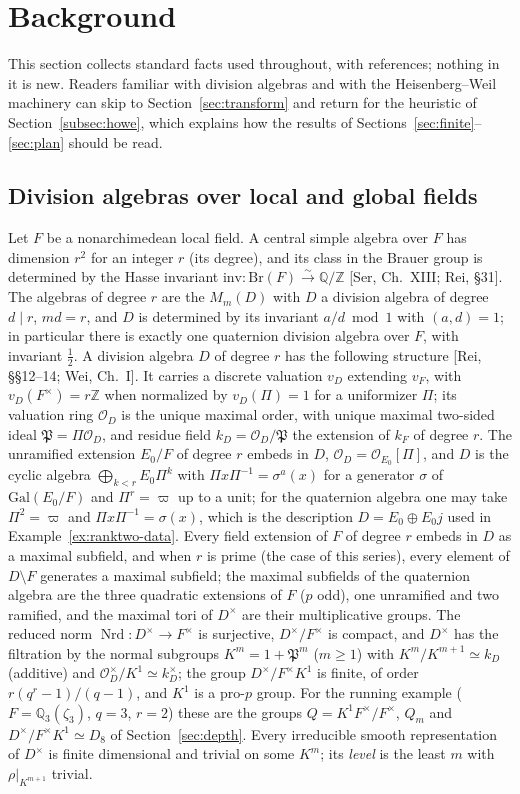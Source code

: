 \documentclass[11pt]{article}
\newcommand{\Z}{\mathbb Z}
\newcommand{\Q}{\mathbb Q}
\newcommand{\Nrd}{\operatorname{Nrd}}
\newcommand{\Ocal}{\mathcal O}
\newcommand{\Pfr}{\mathfrak P}
\theoremstyle{plain}
\theoremstyle{definition}
\begin{document}
\section{Background}\label{sec:background}
This section collects standard facts used throughout, with references;
nothing in it is new.  Readers familiar with division algebras and with
the Heisenberg--Weil machinery can skip to Section~\ref{sec:transform}
and return for the heuristic of Section~\ref{subsec:howe}, which explains
how the results of Sections~\ref{sec:finite}--\ref{sec:plan} should be
read.

\subsection{Division algebras over local and global fields}\label{subsec:divalg}
Let $F$ be a nonarchimedean local field.  A central simple algebra over
$F$ has dimension $r^2$ for an integer $r$ (its degree), and its class in
the Brauer group is determined by the Hasse invariant
$\mathrm{inv}:\mathrm{Br}(F)\xrightarrow{\sim}\Q/\Z$ [Ser, Ch.~XIII; Rei,
\S31].  The algebras of degree $r$ are the $M_m(D)$ with $D$ a division
algebra of degree $d\mid r$, $md=r$, and $D$ is determined by its
invariant $a/d\bmod1$ with $(a,d)=1$; in particular there is exactly one
quaternion division algebra over $F$, with invariant $\tfrac12$.  A
division algebra $D$ of degree $r$ has the following structure
[Rei, \S\S12--14; Wei, Ch.~I].  It carries a discrete valuation $v_D$
extending $v_F$, with $v_D(F^\times)=r\Z$ when normalized by
$v_D(\Pi)=1$ for a uniformizer $\Pi$; its valuation ring $\Ocal_D$ is the
unique maximal order, with unique maximal two-sided ideal
$\Pfr=\Pi\Ocal_D$, and residue field $k_D=\Ocal_D/\Pfr$ the extension of
$k_F$ of degree $r$.  The unramified extension $E_0/F$ of degree $r$
embeds in $D$, $\Ocal_D=\Ocal_{E_0}[\Pi]$, and $D$ is the cyclic algebra
$\bigoplus_{k<r}E_0\Pi^k$ with $\Pi x\Pi^{-1}=\sigma^a(x)$ for a
generator $\sigma$ of $\mathrm{Gal}(E_0/F)$ and $\Pi^r=\varpi$ up to a
unit; for the quaternion algebra one may take $\Pi^2=\varpi$ and
$\Pi x\Pi^{-1}=\sigma(x)$, which is the description
$D=E_0\oplus E_0j$ used in Example~\ref{ex:ranktwo-data}.  Every field
extension of $F$ of degree $r$ embeds in $D$ as a maximal subfield, and
when $r$ is prime (the case of this series), every element of
$D\setminus F$ generates a maximal subfield; the
maximal subfields of the quaternion algebra are the three quadratic
extensions of $F$ ($p$ odd), one unramified and two ramified, and the
maximal tori of $D^\times$ are their multiplicative groups.  The reduced
norm $\Nrd:D^\times\to F^\times$ is surjective, $D^\times/F^\times$ is
compact, and $D^\times$ has the filtration by the normal subgroups
$K^m=1+\Pfr^m$ ($m\ge1$) with $K^m/K^{m+1}\simeq k_D$ (additive) and
$\Ocal_D^\times/K^1\simeq k_D^\times$; the group $D^\times/F^\times K^1$
is finite, of order $r(q^r-1)/(q-1)$, and $K^1$ is a pro-$p$ group.  For
the running example ($F=\Q_3(\zeta_3)$, $q=3$, $r=2$) these are the
groups $Q=K^1F^\times/F^\times$, $Q_m$ and $D^\times/F^\times K^1\simeq D_8$
of Section~\ref{sec:depth}.  Every irreducible smooth representation of
$D^\times$ is finite dimensional and trivial on some $K^m$; its
\emph{level} is the least $m$ with $\rho|_{K^{m+1}}$ trivial.
\end{document}
